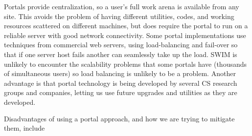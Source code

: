 Portals provide centralization, so a user's full work arena is available from
any site.  This avoids the problem of having different utilities, codes, and
working resources scattered on different machines, but does require the portal
to run on a reliable server with good network connectivity. Some portal 
implementations use techniques from commercial web servers, using load-balancing
and fail-over so that if one server host fails another can seamlessly take up
the load. SWIM is unlikely to encounter the scalability problems that some
portals have (thousands of simultaneous users) so load balancing is unlikely to
be a problem. 
Another advantage is that portal technology is being developed by several CS
research groups and companies, letting us use future upgrades and utilities
as they are developed. 

Disadvantages of using a portal approach, and how we are trying to mitigate
them, include
